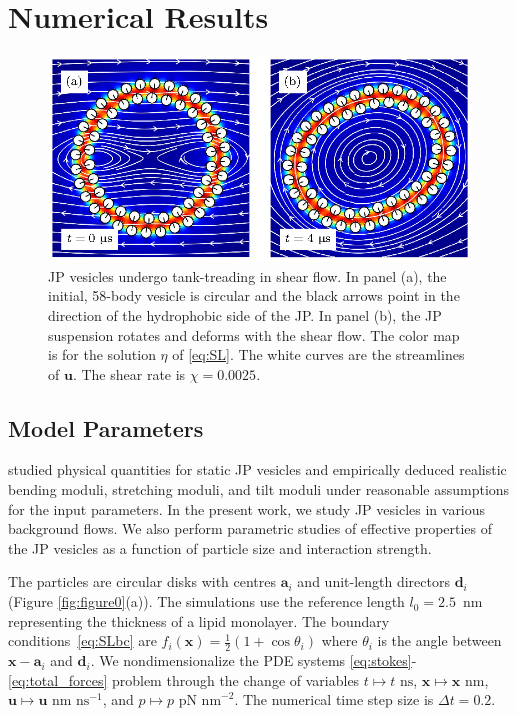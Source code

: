 \documentclass[lineno]{jfm}
\renewcommand{\aa}{\mathbf{a}}
\newcommand{\dd}{\mathbf{d}}
\newcommand{\xx}{\mathbf{x}}
\newcommand{\uu}{\mathbf{u}}
\begin{document}
\section{\label{results}Numerical Results}

\begin{figure}
\centering
\includegraphics[width=11.5cm]{fig2.eps}
  \caption{\label{figure3} 
  JP vesicles undergo tank-treading in shear flow. 
  In panel (a),  the initial, 58-body vesicle is circular and the black arrows point in the direction of the
  hydrophobic side of the JP.
  In panel (b), the JP suspension rotates and deforms with the shear flow.
  The color map is for the solution $\eta$ of \eqref{eq:SL}. 
  The white curves are the streamlines of $\uu.$ 
   The shear rate is $\chi=0.0025$.}
\end{figure}

\subsection{Model Parameters}
\cite{Fu20} studied physical quantities for static JP vesicles
and empirically deduced realistic bending moduli, stretching moduli,
  and tilt moduli under reasonable assumptions for the input parameters.
In the present work, we study JP vesicles in various background flows.
We also perform parametric studies of effective properties of the JP vesicles 
as a function of particle size and interaction strength.

The particles are circular disks with centres 
$\aa_i$ and unit-length directors $\dd_i$ (Figure \ref{fig:figure0}(a)).
The simulations use the reference length $l_0 = 2.5$~nm representing the
thickness of a lipid monolayer.
The boundary conditions~\eqref{eq:SLbc} are $f_i(\xx) = \tfrac{1}{2}(1 + \cos
\theta_i)$ where $\theta_i$ is the angle between $\xx - \aa_i$ and
$\dd_i$.
We nondimensionalize the PDE systems 
\eqref{eq:stokes}-\eqref{eq:total_forces}
problem through the change of variables 
$t \mapsto t \text{ ns}$,
$\xx \mapsto \xx \text{ nm}$, %
$\uu \mapsto \uu \text{ nm ns}^{-1}$, and %
$p \mapsto p \text{ pN nm}^{-2}$.
The numerical time step size is $\Delta t=0.2$.
\end{document}
